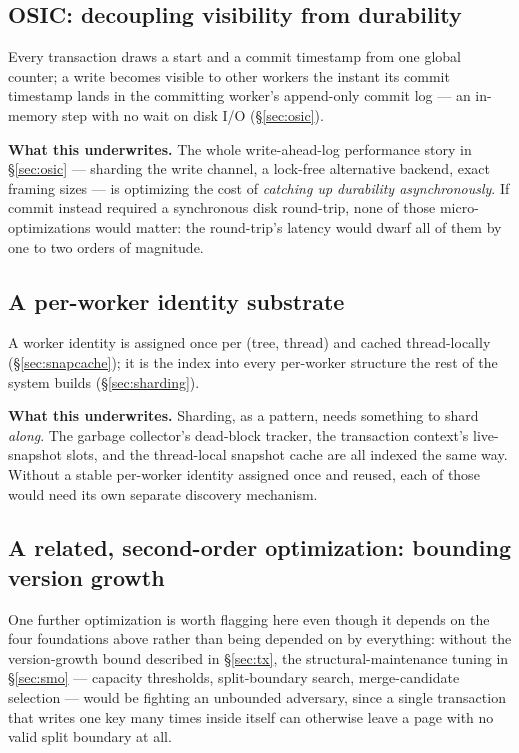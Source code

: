 \documentclass[11pt]{article}
\begin{document}
\subsection{OSIC: decoupling visibility from durability}

Every transaction draws a start and a commit timestamp from one global counter; a
write becomes visible to other workers the instant its commit timestamp lands in
the committing worker's append-only commit log --- an in-memory step with no wait on
disk I/O (\S\ref{sec:osic}).

\textbf{What this underwrites.} The whole write-ahead-log performance story in
\S\ref{sec:osic} --- sharding the write channel, a lock-free alternative backend,
exact framing sizes --- is optimizing the cost of \emph{catching up durability
asynchronously}. If commit instead required a synchronous disk round-trip, none of
those micro-optimizations would matter: the round-trip's latency would dwarf all of
them by one to two orders of magnitude.

\subsection{A per-worker identity substrate}

A worker identity is assigned once per (tree, thread) and cached thread-locally
(\S\ref{sec:snapcache}); it is the index into every per-worker structure the rest of
the system builds (\S\ref{sec:sharding}).

\textbf{What this underwrites.} Sharding, as a pattern, needs something to shard
\emph{along}. The garbage collector's dead-block tracker, the transaction context's
live-snapshot slots, and the thread-local snapshot cache are all indexed the same
way. Without a stable per-worker identity assigned once and reused, each of those
would need its own separate discovery mechanism.

\subsection{A related, second-order optimization: bounding version growth}

One further optimization is worth flagging here even though it depends on the four
foundations above rather than being depended on by everything: without the
version-growth bound described in \S\ref{sec:tx}, the structural-maintenance tuning
in \S\ref{sec:smo} --- capacity thresholds, split-boundary search, merge-candidate
selection --- would be fighting an unbounded adversary, since a single transaction
that writes one key many times inside itself can otherwise leave a page with no
valid split boundary at all.
\end{document}
